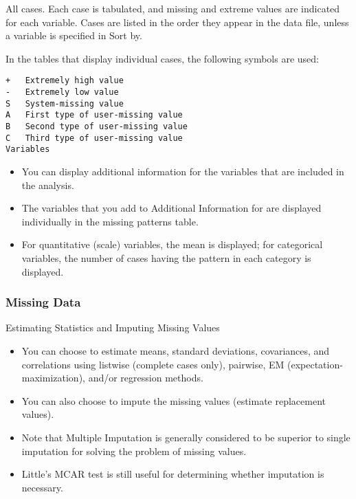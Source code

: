 \documentclass[MASTER.tex]{subfiles}
\begin{document}
	\begin{frame}[fragile]
		\Large
		
All cases. Each case is tabulated, and missing and extreme values are indicated for each variable. Cases are listed in the order they appear in the data file, unless a variable is specified in Sort by.

In the tables that display individual cases, the following symbols are used:
\begin{verbatim}
+	Extremely high value
-	Extremely low value
S	System-missing value
A	First type of user-missing value
B	Second type of user-missing value
C	Third type of user-missing value
Variables
\end{verbatim}
	\end{frame}
	\begin{frame}
		\Large
\begin{itemize}
\item You can display additional information for the variables that are included in the analysis.
\item  The variables that you add to Additional Information for are displayed individually in the missing patterns table. 
\item For quantitative (scale) variables, the mean is displayed; for categorical variables, the number of cases having the pattern in each category is displayed.
\end{itemize}		


	\end{frame}	%
	\begin{frame}
		\frametitle{Missing Data}
		\Large
Estimating Statistics and Imputing Missing Values
\begin{itemize}
\item You can choose to estimate means, standard deviations, covariances, and correlations using listwise (complete cases only), pairwise, EM (expectation-maximization), and/or regression methods.
\item  You can also choose to impute the missing values (estimate replacement values).
\item  Note that Multiple Imputation is generally considered to be superior to single imputation for solving the problem of missing values. 
\item Little's MCAR test is still useful for determining whether imputation is necessary.
\end{itemize}

	\end{frame}
\end{document}
